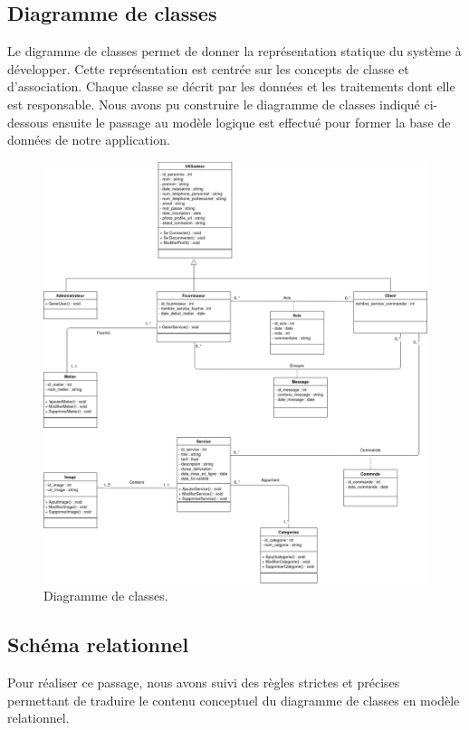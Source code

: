 \documentclass[french]{report}
\begin{document}
        \subsection{Diagramme de classes}
        Le digramme de classes permet de donner la représentation statique du système à développer.
	Cette représentation est centrée sur les concepts de classe et d'association.
	Chaque classe se décrit par les données et les traitements dont elle est responsable.
	Nous avons pu construire le diagramme de classes indiqué ci-dessous ensuite
	le passage au modèle logique est effectué pour former la base de données de notre application.
          \begin{figure}[H]
            \centering
            \includegraphics[width=1\textwidth]{images/Diag de classe.png}
            \caption{Diagramme de classes.}
            \label{Classe diag}
        \end{figure}
\newpage
        \subsection{Schéma relationnel}
        Pour réaliser ce passage, nous avons suivi des règles strictes et précises permettant
	de traduire le contenu conceptuel du diagramme de classes en modèle relationnel.
\end{document}
